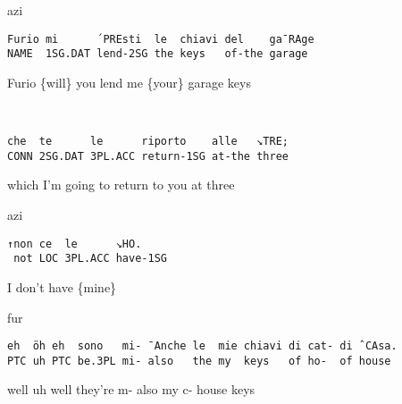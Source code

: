 \documentclass[output=paper,modfonts]{langscibook}
\begin{document}
\vspace{-1mm}
%
\begin{mdframednoverticalspace}[style=firstfoc]
\begin{transbox}{1}{azi}
\begin{verbatim}
Furio mi      ´PREsti  le  chiavi del    ga¯RAge
NAME  1SG.DAT lend-2SG the keys   of-the garage
\end{verbatim}
Furio \{will\} you lend me \{your\} garage keys
\end{transbox}
\end{mdframednoverticalspace}\vspace{1mm}
%
\begin{transbox}{2}{~}
\begin{verbatim}
che  te      le      riporto    alle   ↘TRE;
CONN 2SG.DAT 3PL.ACC return-1SG at-the three
\end{verbatim}
which I'm going to return to you at three
\end{transbox}\vspace{1mm}
%
\begin{mdframednoverticalspace}[style=secondfoc]
\end{mdframednoverticalspace}\vspace{-1mm}
%
\begin{mdframednoverticalspace}[style=firstfoc]
\begin{transbox}{4}{azi}
\begin{verbatim}
↑non ce  le      ↘HO.
 not LOC 3PL.ACC have-1SG
\end{verbatim}
\hspace{0.07cm} I don't have \{mine\}
\end{transbox}
\end{mdframednoverticalspace}\vspace{1.25mm}
%
\vspace{-2.5mm}
%
\begin{mdframednoverticalspace}[style=secondfoc]
\begin{transbox}{6}{fur}
\begin{verbatim}
eh  öh eh  sono   mi- ¯Anche le  mie chiavi di cat- di ˆCAsa.
PTC uh PTC be.3PL mi- also   the my  keys   of ho-  of house
\end{verbatim}
well uh well they're m- also my c- house keys
\end{transbox}
\end{mdframednoverticalspace}\bigskip
\end{document}
